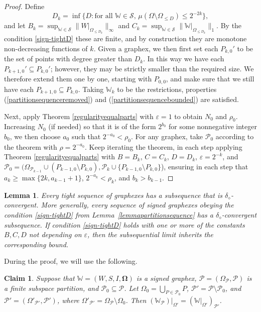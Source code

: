 \documentclass{amsart}
\numberwithin{equation}{section}
\numberwithin{figure}{section}
\newtheorem{lemma}[theorem]{Lemma}
\newtheorem*{claim}{Claim}
\theoremstyle{definition}
\theoremstyle{remark}
\newcommand{\eps}{\varepsilon}
\newcommand{\bOmega}{{\mathbf{\Omega}}}
\newcommand{\cP}{\mathcal{P}}
\newcommand{\cW}{\mathbb{W}}
\newcommand{\cS}{\mathcal{S}}
\newcommand{\sP}{\mathscr{P}}
\def\delGP{\delta_\diamond}
\begin{document}
\begin{proof}
Define
\[
D_k=\inf\{D : \text{for all $\cW\in\cS$, $\mu(\Omega\setminus\Omega_{\leq D})\leq 2^{-2k}$}\},
\]
and let $B_k=\sup_{\cW\in\cS}\|W|_{\Omega_{\leq D_k}}\|_\infty$ and
$C_k=\sup_{\cW\in\cS}\|\cW|_{\Omega_{\leq D_k}}\|_1$. By the condition
\eqref{sign-tightD} these are finite, and by construction they are monotone
non-decreasing functions of $k$. Given a graphex, we then first set each
$P_{k,0}'$ to be the set of points with degree greater than $D_{k}$. In this
way we have each $P_{k+1,0}' \subseteq P_{k,0}'$; however, they may be
strictly smaller than the required size. We therefore extend them one by one,
starting with $P_{0,0}$, and make sure that we still have each $P_{k+1,0}
\subseteq P_{k,0}$. Taking $\cW_k$ to be the restrictions, properties
(\ref{partitionsequenceremoved}) and (\ref{partitionsequencebounded}) are
satisfied.

Next, apply Theorem \ref{regularityequalparts} with $\varepsilon=1$ to obtain
$N_{0}$ and $\rho_0$. Increasing $N_0$ (if needed) so that it is of the form
$2^{b_0}$ for some nonnegative integer $b_0$, we then choose $a_0$ such that
$2^{-a_0}<\rho_0$. For any graphex, take $\sP_0$ according to the theorem
with $\rho=2^{-a_0}$. Keep iterating the theorem, in each step applying
Theorem \ref{regularityequalparts} with $B=B_k$, $C=C_{k}$, $D=D_{k}$,
$\varepsilon=2^{-k}$, and $\sP_0=(\Omega_{\sP_{k-1}} \cup (P_{k-1,0}
\setminus P_{k,0}),\cP_k \cup \{P_{k-1,0} \setminus P_{k,0}\}$), ensuring in
each step that $a_k \ge \max\{2k,a_{k-1}+1\}$, $2^{-a_k}<\rho_k$, and $b_k >
b_{k-1}$.
\end{proof}

\begin{lemma}
\label{lem:tight-relcomp} Every tight sequence of graphexes has a subsequence
that is $\delGP$-convergent. More generally, every sequence of signed
graphexes obeying the condition \eqref{sign-tightD} from
Lemma~\ref{lemmapartitionsequence}
 has a $\delGP$-convergent subsequence. If condition \eqref{sign-tightD} holds
with one or more of the constants $B,C,D$ not depending on $\eps$, then the subsequential
limit inherits the corresponding bound.
\end{lemma}

During the proof, we will use the following.

\begin{claim}
Suppose that $\cW=(W,S,I,\bOmega)$ is a signed graphex, $\sP=(\Omega_{\sP},
\cP)$ is a finite subspace partition, and $\cP_0 \subseteq \cP$. Let
$\Omega_0=\bigcup_{P \in \cP_0} P$, $\cP'=\cP \setminus \cP_0$, and
$\sP'=(\Omega'_{\sP'},\cP')$, where $\Omega'_{\sP'}=\Omega_{\sP} \setminus
\Omega_0$. Then $(\cW_{\sP})|_{\Omega'}=(\cW|_{\Omega'})_{\sP'}$.
\end{claim}
\end{document}
